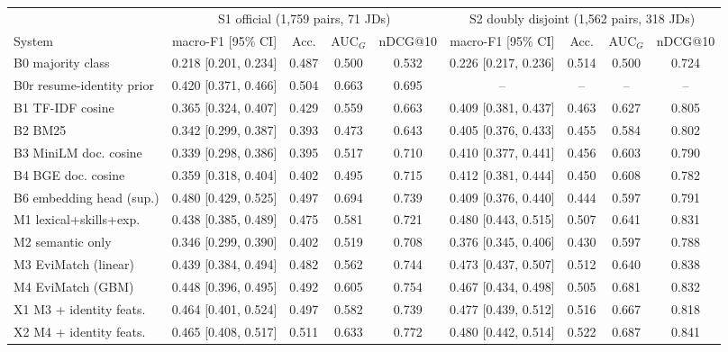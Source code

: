 \begin{tabular}{l cccc cccc}
\toprule
 & \multicolumn{4}{c}{S1 official (1,759 pairs, 71 JDs)} & \multicolumn{4}{c}{S2 doubly disjoint (1,562 pairs, 318 JDs)} \\
\cmidrule(lr){2-5}\cmidrule(lr){6-9}
System & macro-F1 [95\% CI] & Acc. & AUC$_G$ & nDCG@10 & macro-F1 [95\% CI] & Acc. & AUC$_G$ & nDCG@10 \\
\midrule
B0 majority class & 0.218 [0.201, 0.234] & 0.487 & 0.500 & 0.532 & 0.226 [0.217, 0.236] & 0.514 & 0.500 & 0.724 \\
B0r resume-identity prior & 0.420 [0.371, 0.466] & 0.504 & 0.663 & 0.695 & -- & -- & -- & -- \\
B1 TF-IDF cosine & 0.365 [0.324, 0.407] & 0.429 & 0.559 & 0.663 & 0.409 [0.381, 0.437] & 0.463 & 0.627 & 0.805 \\
B2 BM25 & 0.342 [0.299, 0.387] & 0.393 & 0.473 & 0.643 & 0.405 [0.376, 0.433] & 0.455 & 0.584 & 0.802 \\
B3 MiniLM doc. cosine & 0.339 [0.298, 0.386] & 0.395 & 0.517 & 0.710 & 0.410 [0.377, 0.441] & 0.456 & 0.603 & 0.790 \\
B4 BGE doc. cosine & 0.359 [0.318, 0.404] & 0.402 & 0.495 & 0.715 & 0.412 [0.381, 0.444] & 0.450 & 0.608 & 0.782 \\
B6 embedding head (sup.) & 0.480 [0.429, 0.525] & 0.497 & 0.694 & 0.739 & 0.409 [0.376, 0.440] & 0.444 & 0.597 & 0.791 \\
\midrule
M1 lexical+skills+exp. & 0.438 [0.385, 0.489] & 0.475 & 0.581 & 0.721 & 0.480 [0.443, 0.515] & 0.507 & 0.641 & 0.831 \\
M2 semantic only & 0.346 [0.299, 0.390] & 0.402 & 0.519 & 0.708 & 0.376 [0.345, 0.406] & 0.430 & 0.597 & 0.788 \\
M3 EviMatch (linear) & 0.439 [0.384, 0.494] & 0.482 & 0.562 & 0.744 & 0.473 [0.437, 0.507] & 0.512 & 0.640 & 0.838 \\
M4 EviMatch (GBM) & 0.448 [0.396, 0.495] & 0.492 & 0.605 & 0.754 & 0.467 [0.434, 0.498] & 0.505 & 0.681 & 0.832 \\
\midrule
X1 M3 + identity feats. & 0.464 [0.401, 0.524] & 0.497 & 0.582 & 0.739 & 0.477 [0.439, 0.512] & 0.516 & 0.667 & 0.818 \\
X2 M4 + identity feats. & 0.465 [0.408, 0.517] & 0.511 & 0.633 & 0.772 & 0.480 [0.442, 0.514] & 0.522 & 0.687 & 0.841 \\
\bottomrule
\end{tabular}